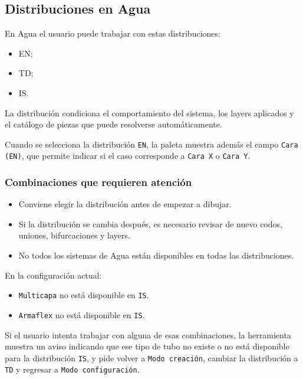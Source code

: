 \documentclass[12pt,a4paper]{article}
\begin{document}
\subsection{Distribuciones en Agua}

En Agua el usuario puede trabajar con estas distribuciones:

\begin{itemize}
\item EN;
\item TD;
\item IS.
\end{itemize}

La distribución condiciona el comportamiento del sistema, los layers aplicados y el catálogo de piezas que puede resolverse automáticamente.

Cuando se selecciona la distribución \texttt{EN}, la paleta muestra además el campo \texttt{Cara (EN)}, que permite indicar si el caso corresponde a \texttt{Cara X} o \texttt{Cara Y}.

\subsubsection{Combinaciones que requieren atención}

\begin{itemize}
\item Conviene elegir la distribución antes de empezar a dibujar.
\item Si la distribución se cambia después, es necesario revisar de nuevo codos, uniones, bifurcaciones y layers.
\item No todos los sistemas de Agua están disponibles en todas las distribuciones.
\end{itemize}

En la configuración actual:

\begin{itemize}
\item \texttt{Multicapa} no está disponible en \texttt{IS}.
\item \texttt{Armaflex} no está disponible en \texttt{IS}.
\end{itemize}

Si el usuario intenta trabajar con alguna de esas combinaciones, la herramienta muestra un aviso indicando que ese tipo de tubo no existe o no está disponible para la distribución \texttt{IS}, y pide volver a \texttt{Modo creación}, cambiar la distribución a \texttt{TD} y regresar a \texttt{Modo configuración}.
\end{document}
